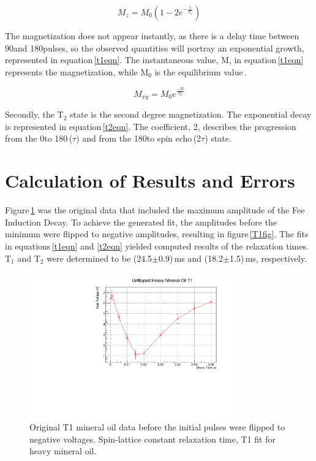 \documentclass[aps,prl,twocolumn,superscriptaddress,nofootinbib]{revtex4-1}
\begin{document}
\begin{equation}
M_z =M_0(1-2e^{-\frac{t}{T_1}})
\label{t1eqn}
\end{equation}

The magnetization does not appear instantly, as there is a delay time between 90\degree and 180\degree pulses, so the observed quantities will portray an exponential growth, represented in equation\,\ref{t1eqn}. The instantaneous value, M, in equation\,\ref{t1eqn} represents the magnetization, while M$_0$ is the equilibrium value\,\cite{2}.

\begin{equation}
M_{xy}=M_0e^{\frac{-2t}{T_2}}
\label{t2eqn}
\end{equation}

Secondly, the T$_2$ state is the second degree magnetization. The exponential decay is represented in equation\,\ref{t2eqn}. The coefficient, 2, describes the progression from the 0\degree to 180\degree\,($\tau$) and from the 180\degree to spin echo\,(2$\tau$) state.




\section{Calculation of Results and Errors}
Figure\,\ref{T1unfig} was the original data that included the maximum amplitude of the Fee Induction Decay. To achieve the generated fit, the amplitudes before the minimum were flipped to negative amplitudes, resulting in figure\,\ref{T1fig}. The fits in equations\,\ref{t1eqn} and \ref{t2eqn} yielded computed results of the relaxation times. T$_1$ and T$_2$ were determined to be (24.5$\pm$0.9)\,ms and (18.2$\pm$1.5)\,ms, respectively.


\begin{figure}[h!]
  \begin{center}
\centerline{\includegraphics[width=3.5in]{t1unflip.pdf}}
\caption{ \small{Original T1 mineral oil data before the initial pulses were flipped to negative voltages. Spin-lattice constant relaxation time, T1 fit for heavy mineral oil. \label{T1unfig}}}
\end{center}
\end{figure}
\end{document}
